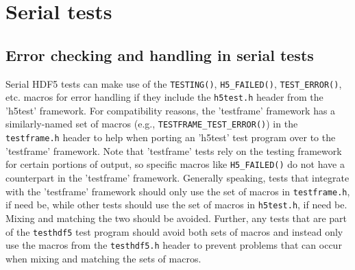 \documentclass[../HDF5_RFC.tex]{subfiles}
\begin{document}
\section{Serial tests}
\label{serial}

\subsection{Error checking and handling in serial tests}

Serial HDF5 tests can make use of the \texttt{TESTING()}, \texttt{H5\_FAILED()}, \texttt{TEST\_ERROR()},
etc. macros for error handling if they include the \texttt{h5test.h} header from the 'h5test' framework.
For compatibility reasons, the 'testframe' framework has a similarly-named set of macros
(e.g., \texttt{TESTFRAME\_TEST\_ERROR()}) in the \texttt{testframe.h} header to help when porting an
'h5test' test program over to the 'testframe' framework. Note that 'testframe' tests rely on the testing
framework for certain portions of output, so specific macros like \texttt{H5\_FAILED()} do not have a
counterpart in the 'testframe' framework. Generally speaking, tests that integrate with the 'testframe'
framework should only use the set of macros in \texttt{testframe.h}, if need be, while other tests should
use the set of macros in \texttt{h5test.h}, if need be. Mixing and matching the two should be avoided.
Further, any tests that are part of the \texttt{testhdf5} test program should avoid both sets of macros
and instead only use the macros from the \texttt{testhdf5.h} header to prevent problems that can occur
when mixing and matching the sets of macros.
\end{document}
